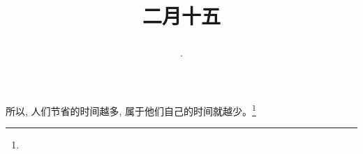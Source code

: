 \title{\date[d=24,m=3,y=2024][year:cn-y,年,month:cn,day:cn,日,·,weekday]·二月十五 }
所以, 人们节省的时间越多, 属于他们自己的时间就越少。\footnote{ }

